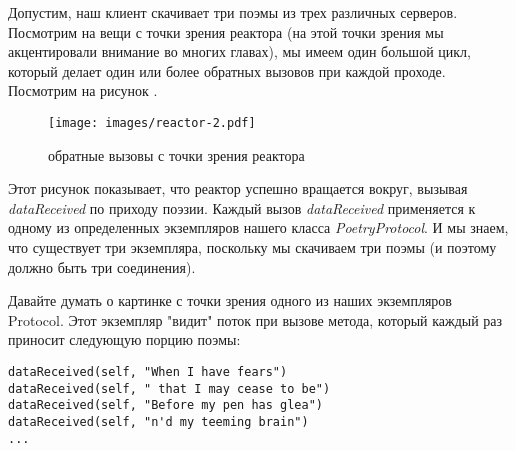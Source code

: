 Допустим, наш клиент скачивает три поэмы из трех 
различных серверов. Посмотрим на вещи с точки зрения 
реактора (на этой точки зрения мы акцентировали внимание 
во многих главах), мы имеем один большой цикл, который 
делает один или более обратных вызовов при каждой проходе. 
Посмотрим на рисунок \label{fig:reactor-2}. 

\begin{figure}[h]
\begin{center}
    \texttt{[image: images/reactor-2.pdf]}
    \caption{обратные вызовы с точки зрения реактора\label{fig:reactor-2}}
\end{center}
\end{figure}


Этот рисунок показывает, что реактор успешно вращается 
вокруг, вызывая \textit{dataReceived} по приходу  поэзии. 
Каждый вызов \textit{dataReceived} применяется к одному из 
определенных экземпляров нашего класса \textit{PoetryProtocol}. 
И мы знаем, что существует три экземпляра, поскольку 
мы скачиваем три поэмы (и поэтому должно быть три соединения). 


Давайте думать о картинке с точки зрения одного 
из наших экземпляров Protocol. Этот экземпляр "видит" 
поток при вызове метода, который каждый раз
приносит следующую порцию поэмы:

 \begin{verbatim}
dataReceived(self, "When I have fears")
dataReceived(self, " that I may cease to be")
dataReceived(self, "Before my pen has glea")
dataReceived(self, "n'd my teeming brain")
...
\end{verbatim} 

